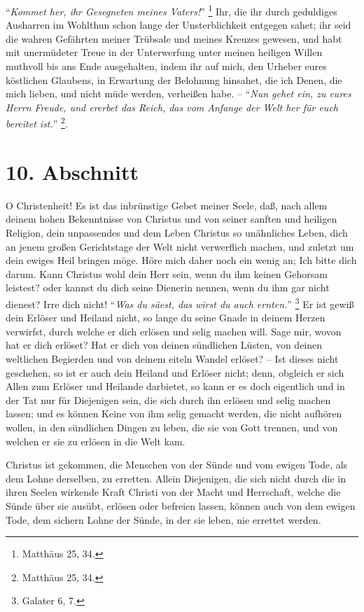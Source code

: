 "`\textit{Kommet her, ihr Gesegneten meines Vaters!}"' \footnote{Matthäus 25, 34.} 
Ihr, die ihr durch geduldiges Ausharren im Wohlthun schon lange der Unsterblichkeit entgegen sahet;
ihr seid die wahren Gefährten meiner Trübsale und meines Kreuzes gewesen, und habt mit unermüdeter Treue in der Unterwerfung unter meinen heiligen Willen muthvoll bis ans Ende ausgehalten, indem ihr auf mich, den Urheber eures köstlichen Glaubens, in Erwartung der Belohnung hinsahet, die ich Denen, die mich lieben, und nicht müde werden, verheißen habe.
-- "`\textit{Nun gehet ein, zu eures Herrn Freude, und ererbet das Reich, das vom Anfange der Welt her für euch bereitet ist.}"' \footnote{Matthäus 25, 34.}.

\section{10. Abschnitt}

O Christenheit!
Es ist das inbrünstige Gebet meiner Seele, daß, nach allem deinem hohen Bekenntnisse von Christus und von seiner sanften und heiligen Religion, dein unpassendes und dem Leben Christus so unähnliches Leben, dich an jenem großen Gerichtstage der Welt nicht verwerflich machen, und zuletzt um dein ewiges Heil bringen möge.
Höre mich daher noch ein wenig an;
Ich bitte dich darum.
Kann Christus wohl dein Herr sein, wenn du ihm keinen Gehorsam leistest?
oder kannst du dich seine Dienerin nennen, wenn du ihm gar nicht dienest? Irre dich nicht!
"`\textit{Was du säest, das wirst du auch ernten.}"' \footnote{Galater 6, 7.} 
Er ist gewiß dein Erlöser und Heiland nicht, so lange du seine Gnade in deinem Herzen verwirfst, durch welche er dich erlösen und selig machen will.
Sage mir, wovon hat er dich erlöset? 
Hat er dich von deinen sündlichen Lüsten, von deinen weltlichen Begierden und von deinem eiteln Wandel erlöset?
-- Ist dieses nicht geschehen, so ist er auch dein Heiland und Erlöser nicht;
denn, obgleich er sich Allen zum Erlöser und Heilande darbietet, so kann er es doch eigentlich und in der Tat nur für Diejenigen sein, die sich durch ihn erlösen und selig machen lassen;
und es können Keine von ihm selig gemacht werden, die nicht aufhören wollen, in den sündlichen Dingen zu leben, die sie von Gott trennen, und von welchen er sie zu erlösen in die Welt kam.

Christus ist gekommen, die Menschen von der Sünde und vom ewigen Tode, als dem Lohne derselben, zu erretten.
Allein Diejenigen, die sich nicht durch die in ihren Seelen wirkende Kraft Christi von der Macht und Herrschaft, welche die Sünde über sie ausübt, erlösen oder befreien lassen, können auch von dem ewigen Tode, dem sichern Lohne der Sünde, in der sie leben, nie errettet werden.


